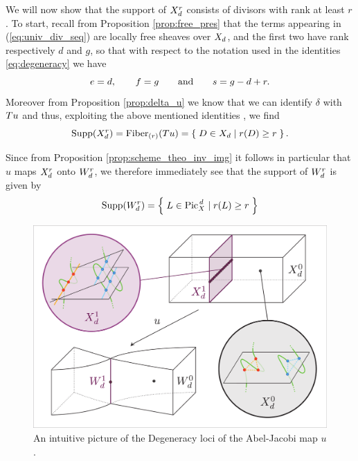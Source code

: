 	We will now show that the support of $X_d^r$ consists of divisors with rank at least $r$. To start, recall from Proposition \ref{prop:free_pres} that the terms appearing in (\ref{eq:univ_div_seq}) are locally free sheaves over $X_d$, and the first two have rank respectively $d$ and $g$, so that with respect to the notation used in the identities \eqref{eq:degeneracy} we have 
	\begin{equation}\label{eq:e_f_k}
		e=d, \qquad f=g \qquad \text{and} \qquad s=g-d+r.
	\end{equation}
	Moreover from Proposition \ref{prop:delta_u} we know that we can identify $\delta$ with $Tu$ and thus, exploiting the above mentioned identities , we find
	\begin{equation*}
		\operatorname{Supp}(X_d^r) = \operatorname{Fiber}_{(r)}(Tu) = \left\{\;  D\in X_d \mid r(D) \geq r  \; \right\}.
	\end{equation*}

	Since from Proposition \ref{prop:scheme_theo_inv_img} it follows in particular that $u$ maps $X_d^r$ onto $W_d^r$, we therefore immediately see that the support of $W_d^r$ is given by 
	$$ \operatorname{Supp}(W_d^r) = \left\{\;  L \in \operatorname{Pic}^{\,d}_X \mid r(L) \geq r  \; \right\} $$


	\begin{figure}[ht]
		\centering
		\includegraphics[width=\textwidth]{Degeneracy3.pdf}
		\caption{An intuitive picture of the Degeneracy loci of the Abel-Jacobi map $u$.}
	\end{figure}


